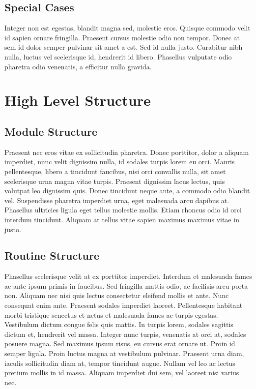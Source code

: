 \subsection{Special Cases}
Integer non est egestas, blandit magna sed, molestie eros. Quisque commodo velit id sapien ornare fringilla. Praesent cursus molestie odio non tempor. Donec at sem id dolor semper pulvinar sit amet a est. Sed id nulla justo. Curabitur nibh nulla, luctus vel scelerisque id, hendrerit id libero. Phasellus vulputate odio pharetra odio venenatis, a efficitur nulla gravida.


\section{High Level Structure}
\subsection{Module Structure}
Praesent nec eros vitae ex sollicitudin pharetra. Donec porttitor, dolor a aliquam imperdiet, nunc velit dignissim nulla, id sodales turpis lorem eu orci. Mauris pellentesque, libero a tincidunt faucibus, nisi orci convallis nulla, sit amet scelerisque urna magna vitae turpis. Praesent dignissim lacus lectus, quis volutpat leo dignissim quis. Donec tincidunt neque ante, a commodo odio blandit vel. Suspendisse pharetra imperdiet urna, eget malesuada arcu dapibus at. Phasellus ultricies ligula eget tellus molestie mollis. Etiam rhoncus odio id orci interdum tincidunt. Aliquam at tellus vitae sapien maximus maximus vitae in justo.

\subsection{Routine Structure}
Phasellus scelerisque velit at ex porttitor imperdiet. Interdum et malesuada fames ac ante ipsum primis in faucibus. Sed fringilla mattis odio, ac facilisis arcu porta non. Aliquam nec nisi quis lectus consectetur eleifend mollis et ante. Nunc consequat enim ante. Praesent sodales imperdiet laoreet. Pellentesque habitant morbi tristique senectus et netus et malesuada fames ac turpis egestas. Vestibulum dictum congue felis quis mattis. In turpis lorem, sodales sagittis dictum et, hendrerit vel massa. Integer nunc turpis, venenatis at orci at, sodales posuere magna. Sed maximus ipsum risus, eu cursus erat ornare ut. Proin id semper ligula. Proin luctus magna at vestibulum pulvinar. Praesent urna diam, iaculis sollicitudin diam at, tempor tincidunt augue. Nullam vel leo ac lectus pretium mollis in id massa. Aliquam imperdiet dui sem, vel laoreet nisi varius nec.
